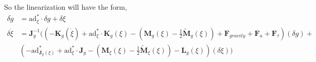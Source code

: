 \documentclass[10pt]{article}
\newcommand{\ad}{\ensuremath{\mathrm{ad}}}
\begin{document}
%
So the linearization will have the form,
\begin{align*}
\delta \dot{g} &= \ad^*_{\xi} \cdot \delta g + \delta \xi \\
\delta \dot{\xi} &=  \mathbf{J}_g^{-1} ((-\mathbf{K}_g(\dot{\xi}) + \ad^*_\xi \cdot \mathbf{K}_g(\xi)- (\mathbf{M}_g(\xi) - \frac{1}{2}\tilde{\mathbf{M}}_g(\xi)) + \mathbf{F}_{gravity} + \mathbf{F}_a + \mathbf{F}_\tau) (\delta g) + \\
& (-\ad^*_{\mathbf{J}_g(\xi)} + \ad^*_\xi \cdot \mathbf{J}_g - (\mathbf{M}_\xi(\xi) - \frac{1}{2}\tilde{\mathbf{M}}_\xi(\xi)) - \mathbf{L}_g(\xi)) (\delta \xi))
\end{align*}
\end{document}
